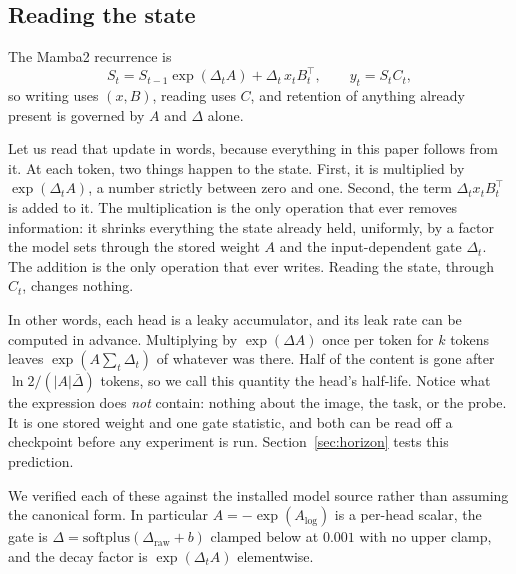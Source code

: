\documentclass{article}
\begin{document}
\subsection{Reading the state}

The Mamba2 recurrence is
\begin{equation}
S_t = S_{t-1}\exp(\Delta_t A) + \Delta_t\, x_t B_t^{\top},
\qquad y_t = S_t C_t ,
\end{equation}
so writing uses $(x, B)$, reading uses $C$, and retention of anything already
present is governed by $A$ and $\Delta$ alone.

Let us read that update in words, because everything in this paper follows
from it. At each token, two things happen to the state. First, it is
multiplied by $\exp(\Delta_t A)$, a number strictly between zero and one.
Second, the term $\Delta_t x_t B_t^{\top}$ is added to it. The multiplication
is the only operation that ever removes information: it shrinks everything the
state already held, uniformly, by a factor the model sets through the stored
weight $A$ and the input-dependent gate $\Delta_t$. The addition is the only
operation that ever writes. Reading the state, through $C_t$, changes nothing.

In other words, each head is a leaky accumulator, and its leak rate can be
computed in advance. Multiplying by $\exp(\Delta A)$ once per token for $k$
tokens leaves $\exp(A\sum_t\Delta_t)$ of whatever was there. Half of the
content is gone after $\ln 2/(|A|\bar{\Delta})$ tokens, so we call this
quantity the head's half-life. Notice what the expression does \emph{not}
contain: nothing about the image, the task, or the probe. It is one stored
weight and one gate statistic, and both can be read off a checkpoint before
any experiment is run. Section~\ref{sec:horizon} tests this prediction.

We verified each of these
against the installed model source rather than assuming the canonical form.
In particular $A = -\exp(A_{\log})$ is a per-head scalar, the gate is
$\Delta = \mathrm{softplus}(\Delta_{\text{raw}} + b)$ clamped below at
$0.001$ with no upper clamp, and the decay factor is
$\exp(\Delta_t A)$ elementwise.
\end{document}
